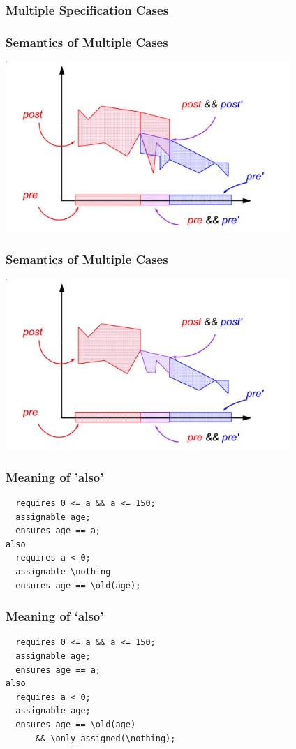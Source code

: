 \begin{frame}
\frametitle{Multiple Specification Cases}

\end{frame}

\begin{frame}
\frametitle{Semantics of Multiple Cases}
\transdissolve[duration=0.5]
\includegraphics[width=4.25in]{join-both}
\end{frame}

\begin{frame}
\frametitle{Semantics of Multiple Cases}
\includegraphics[width=4.25in]{join-intersect}
\end{frame}

\begin{frame}[fragile]
\frametitle{Meaning of 'also'}
\begin{lstlisting}
  requires 0 <= a && a <= 150;
  assignable age;
  ensures age == a;
also
  requires a < 0;
  assignable \nothing
  ensures age == \old(age);
\end{lstlisting}
\end{frame}

\begin{frame}[fragile]
\frametitle{Meaning of `also'}
\begin{lstlisting}
  requires 0 <= a && a <= 150;
  assignable age;
  ensures age == a;
also
  requires a < 0;
  assignable age;
  ensures age == \old(age)
      && \only_assigned(\nothing);
\end{lstlisting}
\end{frame}

